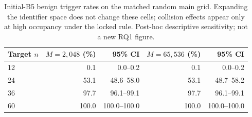 \begin{table}[t]
\centering
\caption{Initial-B5 benign trigger rates on the matched random main grid. Expanding the identifier space does not change these cells; collision effects appear only at high occupancy under the locked rule. Post-hoc descriptive sensitivity; not a new RQ1 figure.}
\label{tab:e1-ipid-initial}
\begingroup
\fontsize{9}{10.8}\selectfont
\setlength{\tabcolsep}{3pt}
\begin{tabular}{lrrrr}
\hline
Target $n$ & $M=2{,}048$ (\%) & 95\% CI & $M=65{,}536$ (\%) & 95\% CI \\
\hline
12 & 0.1 & 0.0--0.2 & 0.1 & 0.0--0.2 \\
24 & 53.1 & 48.6--58.0 & 53.1 & 48.7--58.2 \\
36 & 97.7 & 96.1--99.1 & 97.7 & 96.1--99.1 \\
60 & 100.0 & 100.0--100.0 & 100.0 & 100.0--100.0 \\
\hline
\end{tabular}
\endgroup
\end{table}
